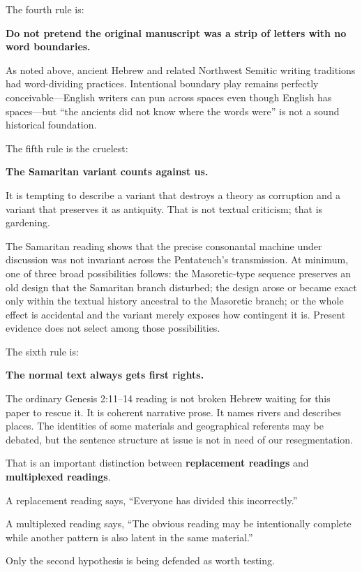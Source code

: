 The fourth rule is:

\textbf{Do not pretend the original manuscript was a strip of letters with no word boundaries.}

As noted above, ancient Hebrew and related Northwest Semitic writing traditions had word-dividing practices. Intentional boundary play remains perfectly conceivable---English writers can pun across spaces even though English has spaces---but ``the ancients did not know where the words were'' is not a sound historical foundation.\cite{Millard1970}

The fifth rule is the cruelest:

\textbf{The Samaritan variant counts against us.}

It is tempting to describe a variant that destroys a theory as corruption and a variant that preserves it as antiquity. That is not textual criticism; that is gardening.

The Samaritan reading shows that the precise consonantal machine under discussion was not invariant across the Pentateuch's transmission. At minimum, one of three broad possibilities follows: the Masoretic-type sequence preserves an old design that the Samaritan branch disturbed; the design arose or became exact only within the textual history ancestral to the Masoretic branch; or the whole effect is accidental and the variant merely exposes how contingent it is. Present evidence does not select among those possibilities.\cite{SamaritanGenesis,Naaijer2024,Hjelm2020}

The sixth rule is:

\textbf{The normal text always gets first rights.}

The ordinary Genesis 2:11--14 reading is not broken Hebrew waiting for this paper to rescue it. It is coherent narrative prose. It names rivers and describes places. The identities of some materials and geographical referents may be debated, but the sentence structure at issue is not in need of our resegmentation.\cite{MasoreticGenesis}

That is an important distinction between \textbf{replacement readings} and \textbf{multiplexed readings}.

A replacement reading says, ``Everyone has divided this incorrectly.''

A multiplexed reading says, ``The obvious reading may be intentionally complete while another pattern is also latent in the same material.''

Only the second hypothesis is being defended as worth testing.

